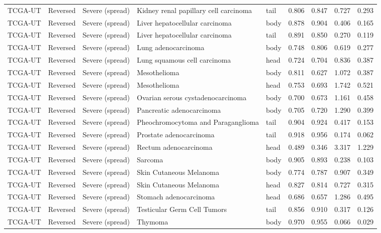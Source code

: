 \begin{longtable}{lllllrrrr}
TCGA-UT & Reversed & Severe (spread) & Kidney renal papillary cell carcinoma & tail & 0.806 & 0.847 & 0.727 & 0.293 \\
TCGA-UT & Reversed & Severe (spread) & Liver hepatocellular carcinoma & body & 0.878 & 0.904 & 0.406 & 0.165 \\
TCGA-UT & Reversed & Severe (spread) & Liver hepatocellular carcinoma & tail & 0.891 & 0.850 & 0.270 & 0.119 \\
TCGA-UT & Reversed & Severe (spread) & Lung adenocarcinoma & body & 0.748 & 0.806 & 0.619 & 0.277 \\
TCGA-UT & Reversed & Severe (spread) & Lung squamous cell carcinoma & head & 0.724 & 0.704 & 0.836 & 0.387 \\
TCGA-UT & Reversed & Severe (spread) & Mesothelioma & body & 0.811 & 0.627 & 1.072 & 0.387 \\
TCGA-UT & Reversed & Severe (spread) & Mesothelioma & head & 0.753 & 0.693 & 1.742 & 0.521 \\
TCGA-UT & Reversed & Severe (spread) & Ovarian serous cystadenocarcinoma & body & 0.700 & 0.673 & 1.161 & 0.458 \\
TCGA-UT & Reversed & Severe (spread) & Pancreatic adenocarcinoma & body & 0.705 & 0.720 & 1.290 & 0.399 \\
TCGA-UT & Reversed & Severe (spread) & Pheochromocytoma and Paraganglioma & tail & 0.904 & 0.924 & 0.417 & 0.153 \\
TCGA-UT & Reversed & Severe (spread) & Prostate adenocarcinoma & tail & 0.918 & 0.956 & 0.174 & 0.062 \\
TCGA-UT & Reversed & Severe (spread) & Rectum adenocarcinoma & head & 0.489 & 0.346 & 3.317 & 1.229 \\
TCGA-UT & Reversed & Severe (spread) & Sarcoma & body & 0.905 & 0.893 & 0.238 & 0.103 \\
TCGA-UT & Reversed & Severe (spread) & Skin Cutaneous Melanoma & body & 0.774 & 0.787 & 0.907 & 0.349 \\
TCGA-UT & Reversed & Severe (spread) & Skin Cutaneous Melanoma & head & 0.827 & 0.814 & 0.727 & 0.315 \\
TCGA-UT & Reversed & Severe (spread) & Stomach adenocarcinoma & head & 0.686 & 0.657 & 1.286 & 0.495 \\
TCGA-UT & Reversed & Severe (spread) & Testicular Germ Cell Tumors & tail & 0.856 & 0.910 & 0.317 & 0.126 \\
TCGA-UT & Reversed & Severe (spread) & Thymoma & body & 0.970 & 0.955 & 0.066 & 0.029 \\

\end{longtable}
